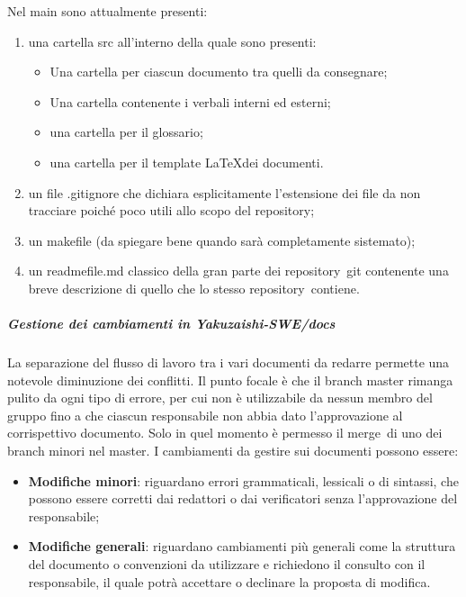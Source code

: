         Nel main sono attualmente presenti:
        \begin{enumerate}
            \item una cartella src all'interno della quale sono presenti:
            \begin{itemize}
                \item Una cartella per ciascun documento tra quelli da consegnare;
                \item Una cartella contenente i verbali interni ed esterni;
                \item una cartella per il glossario;
                \item una cartella per il template \LaTeX dei documenti.
            \end{itemize}
            \item un file .gitignore che dichiara esplicitamente l’estensione dei file da non tracciare poiché poco utili allo scopo del repository\glo;
            \item un makefile (da spiegare bene quando sarà completamente sistemato);
            \item un readmefile.md classico della gran parte dei repository\glo\ git contenente una breve descrizione di quello che lo stesso repository\glo\ contiene.
        \end{enumerate}
            \subparagraph{Gestione dei cambiamenti in Yakuzaishi-SWE/docs}
            La separazione del flusso di lavoro tra i vari documenti da redarre permette una notevole diminuzione dei conflitti. Il punto focale è che il branch master rimanga pulito da ogni tipo di errore, per cui non è utilizzabile da nessun membro del gruppo fino a che ciascun responsabile non abbia dato l’approvazione al corrispettivo documento. Solo in quel momento è permesso il merge\glo\ di uno dei branch minori nel master. I cambiamenti da gestire sui documenti possono essere:
            \begin{itemize}
                \item \textbf{Modifiche minori}: riguardano errori grammaticali, lessicali o di sintassi, che possono essere corretti dai redattori o dai verificatori senza l’approvazione del responsabile;
                \item \textbf{Modifiche generali}: riguardano cambiamenti più generali come la struttura del documento o convenzioni da utilizzare e richiedono il consulto con il responsabile, il quale potrà accettare o declinare la proposta di modifica.
            \end{itemize}

